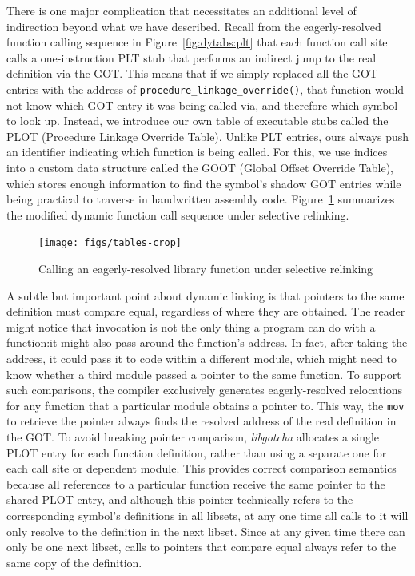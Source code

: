 There is one major complication that necessitates an additional level of indirection
beyond what we have described.  Recall from the eagerly-resolved function calling
sequence in Figure~\ref{fig:dytabs:plt} that each function call site calls a
one-instruction PLT stub that performs an indirect jump to the real definition via
the GOT.  This means that if we simply replaced all the GOT entries with the address
of \texttt{procedure\_linkage\_override()}, that function would not know which GOT
entry it was being called via, and therefore which symbol to look up.  Instead, we
introduce our own table of executable stubs called the PLOT (Procedure Linkage
Override Table).  Unlike PLT entries, ours always push an identifier indicating which
function is being called.  For this, we use indices into a custom data structure
called the GOOT (Global Offset Override Table), which stores enough information to
find the symbol's shadow GOT entries while being practical to traverse in handwritten
assembly code.  Figure~\ref{fig:override} summarizes the modified dynamic function
call sequence under selective relinking.

\begin{figure}
\texttt{[image: figs/tables-crop]}
\caption{Calling an eagerly-resolved library function under selective relinking}
\label{fig:override}
\end{figure}

A subtle but important point about dynamic linking is that pointers to the same
definition must compare equal, regardless of where they are obtained.
The reader might notice that invocation is not the only thing a program can do with a
function:\@ it might also pass around the function's address.  In fact, after taking
the address, it could pass it to code within a different module, which might need to
know whether a third module passed a pointer to the same function.  To support such
comparisons, the compiler exclusively generates eagerly-resolved relocations for any
function that a particular module obtains a pointer to.  This way, the \texttt{mov}
to retrieve the pointer always finds the resolved address of the real definition in
the GOT.  To avoid breaking pointer comparison, \textit{libgotcha} allocates a single
PLOT entry for each function definition, rather than using a separate one for each
call site or dependent module.  This
provides correct comparison semantics because all references to a particular function
receive the same pointer to the shared PLOT entry, and although this pointer
technically refers to the corresponding symbol's definitions in all libsets, at any
one time all calls to it will only resolve to the definition in the next libset.
Since at any given time there can only be one next libset, calls to pointers that
compare equal always refer to the same copy of the definition.


